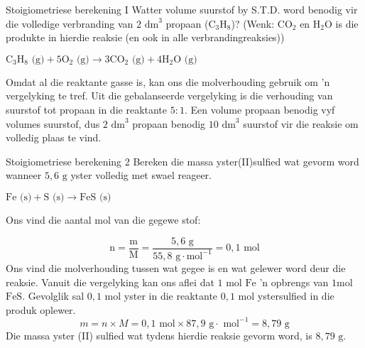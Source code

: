       \begin{wex}{Stoigiometriese berekening I }
{
Watter volume suurstof by S.T.D. word benodig vir die volledige verbranding van $2 {\text{ dm}}^{3}$ propaan ($\text{C}{}_{3}\text{H}{}_{8}$)? (Wenk: $\text{CO}{}_{2}$ en $\text{H}{}_{2}\text{O}$ is die produkte in hierdie reaksie (en ook in alle verbrandingreaksies))
      }
{
${\text{C}}_{3}{\text{H}}_{8} \text{ (g)} + 5{\text{O}}_{2} \text{ (g)} \to 3\text{C}{\text{O}}_{2} \text{ (g)} + 4{\text{H}}_{2}\text{O} \text{ (g)}$
       
Omdat al die reaktante gasse is, kan ons die molverhouding gebruik om 'n vergelyking te tref. Uit die gebalanseerde vergelyking is die verhouding van suurstof tot propaan in die reaktante  $5:1$.
      \label{m38712*id284304}Een volume propaan benodig vyf volumes suurstof, dus $2 {\text{ dm}}^{3}$ propaan benodig $10 {\text{ dm}}^{3}$ suurstof vir die reaksie om volledig plaas te vind.
}
    \end{wex}
    \noindent
\label{m38712*secfhsst!!!underscore!!!id1972} 
      \begin{wex}{Stoigiometriese berekening 2 }
{
      \label{m38712*probfhsst!!!underscore!!!id1973}
      \label{m38712*id284347}Bereken die massa yster(II)sulfied wat gevorm word wanneer $5,6 \text{ g}$ yster volledig met swael reageer.
      }
{
      \label{m38712*id284378}$\text{Fe} \text{ (s)} + \text{S} \text{ (s)} \to \text{FeS} \text{ (s)}$
       
        Ons vind die aantal mol van die gegewe stof:
      \label{m38712*id284430}\nopagebreak\noindent{}
        
    \begin{equation*}
    \text{n}=\frac{\text{m}}{\text{M}}=\frac{5,6 \text{ g}}{55,8 \text{ g} \cdot \text{mol}^{-1}} = 0,1\text{ mol}
      \end{equation*}
       Ons vind die molverhouding tussen wat gegee is en wat gelewer word deur die reaksie. Vanuit die vergelyking kan ons aflei dat $1 \text{ mol}$ $\text{Fe}$  'n opbrengs van  $1 \text{mol}$ $\text{FeS}$. Gevolglik sal $0,1\text{ mol}$ yster in die reaktante $0,1 \text{ mol}$ ystersulfied in die produk oplewer. 
      \label{m38712*id284499}\nopagebreak\noindent{}
    \begin{equation*}
    m=n \times M = 0,1 \text{ mol} \times 87,9 \text{ g} \cdot \text{ mol}^{-1} = 8,79 \text{ g}
      \end{equation*}
      \label{m38712*id284548}Die massa yster (II) sulfied wat tydens hierdie reaksie gevorm word, is $8,79 \text{ g}$. 
}
    \end{wex}
    \noindent
